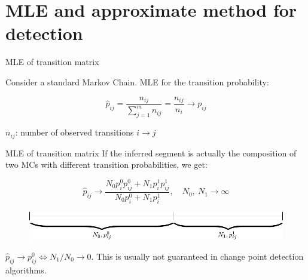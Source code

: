 \documentclass{beamer}
\begin{document}

\section{MLE and approximate method for detection}

\begin{frame}{MLE of transition matrix}

Consider a standard Markov Chain. MLE for the transition probability:

\begin{equation*}\label{Eq:MLE}
\hat{p}_{ij} = \frac{n_{ij}}{\sum_{j=1}^m n_{ij}} = \frac{n_{ij}}{n_i} \longrightarrow p_{ij}
\end{equation*}

$n_{ij}$: number of observed transitions $ i\rightarrow j $
\end{frame}


\begin{frame}{MLE of transition matrix}
If the inferred segment is actually the composition of two MCs with different transition probabilities, we get: 

\begin{equation*}\label{}
	\hat{p}_{ij}  \longrightarrow \frac{N_0 p_i^0 p_{ij}^0 + N_1 p_i^1 p_{ij}^1}{N_0 p_i^0 + N_1 p_i^1}, \quad N_0,\ N_1 \rightarrow \infty
\end{equation*}

	\begin{figure}[h]
	\centering
	\includegraphics[width=1\linewidth]{MC.pdf}
	\vspace{-15pt}
\end{figure}
\pause
 $\hat{p}_{ij} \rightarrow p_{ij}^0 \iff N_1/N_0 \rightarrow 0$.
\alert{This is usually not guaranteed in change point detection algorithms.}

\end{frame}
\end{document}
